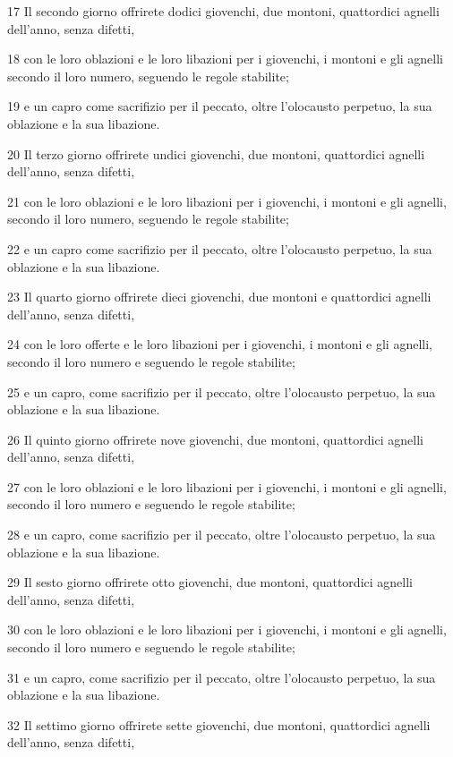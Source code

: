 \par 17 Il secondo giorno offrirete dodici giovenchi, due montoni, quattordici agnelli dell'anno, senza difetti,
\par 18 con le loro oblazioni e le loro libazioni per i giovenchi, i montoni e gli agnelli secondo il loro numero, seguendo le regole stabilite;
\par 19 e un capro come sacrifizio per il peccato, oltre l'olocausto perpetuo, la sua oblazione e la sua libazione.
\par 20 Il terzo giorno offrirete undici giovenchi, due montoni, quattordici agnelli dell'anno, senza difetti,
\par 21 con le loro oblazioni e le loro libazioni per i giovenchi, i montoni e gli agnelli, secondo il loro numero, seguendo le regole stabilite;
\par 22 e un capro come sacrifizio per il peccato, oltre l'olocausto perpetuo, la sua oblazione e la sua libazione.
\par 23 Il quarto giorno offrirete dieci giovenchi, due montoni e quattordici agnelli dell'anno, senza difetti,
\par 24 con le loro offerte e le loro libazioni per i giovenchi, i montoni e gli agnelli, secondo il loro numero e seguendo le regole stabilite;
\par 25 e un capro, come sacrifizio per il peccato, oltre l'olocausto perpetuo, la sua oblazione e la sua libazione.
\par 26 Il quinto giorno offrirete nove giovenchi, due montoni, quattordici agnelli dell'anno, senza difetti,
\par 27 con le loro oblazioni e le loro libazioni per i giovenchi, i montoni e gli agnelli, secondo il loro numero e seguendo le regole stabilite;
\par 28 e un capro, come sacrifizio per il peccato, oltre l'olocausto perpetuo, la sua oblazione e la sua libazione.
\par 29 Il sesto giorno offrirete otto giovenchi, due montoni, quattordici agnelli dell'anno, senza difetti,
\par 30 con le loro oblazioni e le loro libazioni per i giovenchi, i montoni e gli agnelli, secondo il loro numero e seguendo le regole stabilite;
\par 31 e un capro, come sacrifizio per il peccato, oltre l'olocausto perpetuo, la sua oblazione e la sua libazione.
\par 32 Il settimo giorno offrirete sette giovenchi, due montoni, quattordici agnelli dell'anno, senza difetti,

